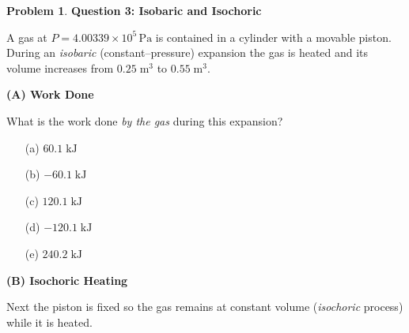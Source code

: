 \documentclass[10pt]{article}
\theoremstyle{definition} %
\newtheorem{problem}{Problem}
\theoremstyle{plain} %
\begin{document}
                                              \begin{problem}
                                                \textbf{Question 3: Isobaric and Isochoric}
                                                
                                                A gas at \(P = 4.00339\times10^{5}\,\text{Pa}\) is contained in a cylinder
                                                with a movable piston.  
                                                During an \emph{isobaric} (constant–pressure) expansion the gas is heated
                                                and its volume increases from \(0.25\;\text{m}^{3}\) to \(0.55\;\text{m}^{3}\).
                                                
                                                \medskip
                                                \textbf{(A) Work Done}
                                                
                                                What is the work done \emph{by the gas} during this expansion?
                                                
                                                \begin{enumerate}
                                                  \item[(a)] \(60.1\;\text{kJ}\)
                                                  \item[(b)] \(-60.1\;\text{kJ}\)
                                                  \item[(c)] \(120.1\;\text{kJ}\)
                                                  \item[(d)] \(-120.1\;\text{kJ}\)
                                                  \item[(e)] \(240.2\;\text{kJ}\)
                                                \end{enumerate}
                                                
                                                \bigskip
                                                \textbf{(B) Isochoric Heating}
                                                
                                                Next the piston is fixed so the gas remains at constant volume
                                                (\emph{isochoric} process) while it is heated.
                                                

\end{problem}
\end{document}
